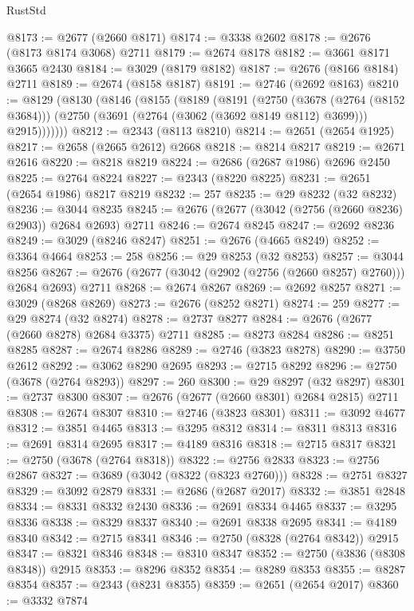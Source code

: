 \begin{lexlean}{RustStd}
\begin{coremodule}
@8173 := @2677 (@2660 @8171)
@8174 := @3338 @2602
@8178 := @2676 (@8173 @8174 @3068) @2711
@8179 := @2674 @8178
@8182 := @3661 @8171 @3665 @2430
@8184 := @3029 (@8179 @8182)
@8187 := @2676 (@8166 @8184) @2711
@8189 := @2674 (@8158 @8187)
@8191 := @2746 (@2692 @8163)
@8210 := @8129
    (@8130
      (@8146
        (@8155
          (@8189
            (@8191
              (@2750
                (@3678 (@2764 (@8152 @3684)))
                (@2750 (@3691 (@2764 (@3062 (@3692 @8149 @8112) @3699))) @2915)))))))
@8212 := @2343 (@8113 @8210)
@8214 := @2651 (@2654 @1925)
@8217 := @2658 (@2665 @2612) @2668
@8218 := @8214 @8217
@8219 := @2671 @2616
@8220 := @8218 @8219
@8224 := @2686 (@2687 @1986) @2696 @2450
@8225 := @2764 @8224
@8227 := @2343 (@8220 @8225)
@8231 := @2651 (@2654 @1986) @8217 @8219
@8232 := 257
@8235 := @29 @8232 (@32 @8232)
@8236 := @3044 @8235
@8245 := @2676 (@2677 (@3042 (@2756 (@2660 @8236) @2903)) @2684 @2693) @2711
@8246 := @2674 @8245
@8247 := @2692 @8236
@8249 := @3029 (@8246 @8247)
@8251 := @2676 (@4665 @8249)
@8252 := @3364 @4664
@8253 := 258
@8256 := @29 @8253 (@32 @8253)
@8257 := @3044 @8256
@8267 := @2676 (@2677 (@3042 (@2902 (@2756 (@2660 @8257) @2760))) @2684 @2693) @2711
@8268 := @2674 @8267
@8269 := @2692 @8257
@8271 := @3029 (@8268 @8269)
@8273 := @2676 (@8252 @8271)
@8274 := 259
@8277 := @29 @8274 (@32 @8274)
@8278 := @2737 @8277
@8284 := @2676 (@2677 (@2660 @8278) @2684 @3375) @2711
@8285 := @8273 @8284
@8286 := @8251 @8285
@8287 := @2674 @8286
@8289 := @2746 (@3823 @8278)
@8290 := @3750 @2612
@8292 := @3062 @8290 @2695
@8293 := @2715 @8292
@8296 := @2750 (@3678 (@2764 @8293))
@8297 := 260
@8300 := @29 @8297 (@32 @8297)
@8301 := @2737 @8300
@8307 := @2676 (@2677 (@2660 @8301) @2684 @2815) @2711
@8308 := @2674 @8307
@8310 := @2746 (@3823 @8301)
@8311 := @3092 @4677
@8312 := @3851 @4465
@8313 := @3295 @8312
@8314 := @8311 @8313
@8316 := @2691 @8314 @2695
@8317 := @4189 @8316
@8318 := @2715 @8317
@8321 := @2750 (@3678 (@2764 @8318))
@8322 := @2756 @2833
@8323 := @2756 @2867
@8327 := @3689 (@3042 (@8322 (@8323 @2760)))
@8328 := @2751 @8327
@8329 := @3092 @2879
@8331 := @2686 (@2687 @2017)
@8332 := @3851 @2848
@8334 := @8331 @8332 @2430
@8336 := @2691 @8334 @4465
@8337 := @3295 @8336
@8338 := @8329 @8337
@8340 := @2691 @8338 @2695
@8341 := @4189 @8340
@8342 := @2715 @8341
@8346 := @2750 (@8328 (@2764 @8342)) @2915
@8347 := @8321 @8346
@8348 := @8310 @8347
@8352 := @2750 (@3836 (@8308 @8348)) @2915
@8353 := @8296 @8352
@8354 := @8289 @8353
@8355 := @8287 @8354
@8357 := @2343 (@8231 @8355)
@8359 := @2651 (@2654 @2017)
@8360 := @3332 @7874

\end{coremodule}
\end{lexlean}
